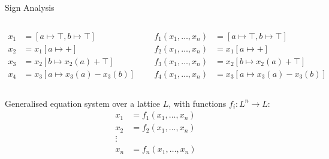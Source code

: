 \documentclass[aspectratio=169,xcolor=dvipsnames]{beamer}
\begin{document}
\begin{frame}[fragile]{Sign Analysis}

	\begin{columns}[c] %

		\begin{align*}
			x_1 & = [a \mapsto \top, b \mapsto \top] \\
			x_2 & = x_1[a \mapsto +]                 \\
			x_3 & = x_2[b \mapsto x_2(a) + \top]     \\
			x_4 & = x_3[a \mapsto x_3(a) - x_3(b)]
		\end{align*}

		\begin{align*}
			f_1(x_1, \ldots, x_n) & = [a \mapsto \top, b \mapsto \top] \\
			f_2(x_1, \ldots, x_n) & = x_1[a \mapsto +]                 \\
			f_3(x_1, \ldots, x_n) & = x_2[b \mapsto x_2(a) + \top]     \\
			f_4(x_1, \ldots, x_n) & = x_3[a \mapsto x_3(a) - x_3(b)]
		\end{align*}
	\end{columns} \bigskip

	Generalised equation system over a lattice $L$, with functions $f_i: L^n
		\rightarrow L$:
	\begin{align*}
		x_1 & = f_1(x_1, \ldots, x_n) \\
		x_2 & = f_2(x_1, \ldots, x_n) \\
		\vdots                        \\
		x_n & = f_n(x_1, \ldots, x_n)
	\end{align*}
\end{frame}

\end{document}

